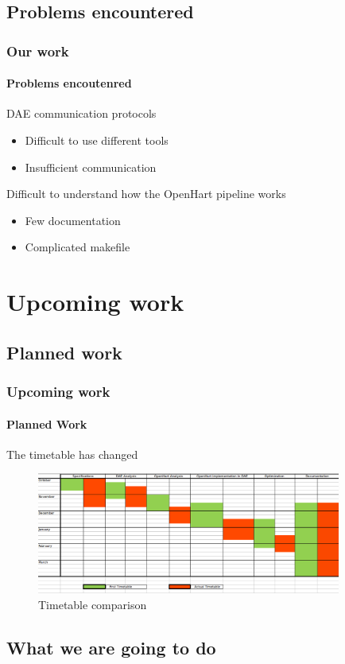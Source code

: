 \documentclass[c]{beamer}
\begin{document}
\subsection{Problems encountered}
\begin{frame}
\frametitle{Our work}
\framesubtitle{Problems encoutenred}
\begin{block}{DAE communication protocols}
\begin{itemize}
\item Difficult to use different tools
\item Insufficient communication
\end{itemize}
\end{block}
\begin{block}{Difficult to understand how the OpenHart pipeline works}
\begin{itemize}
\item Few documentation
\item Complicated makefile
\end{itemize}
\end{block}
\end{frame}
\section{Upcoming work}
\subsection{Planned work}
\begin{frame}
\frametitle{Upcoming work}
\framesubtitle{Planned Work}
The timetable has changed
  \begin{figure}
  \begin{center}
    \includegraphics[width=10cm]{planning.png}
	\newline
	Timetable comparison
  \end{center}
  \end{figure}
\end{frame}

\subsection{What we are going to do}
\end{document}
